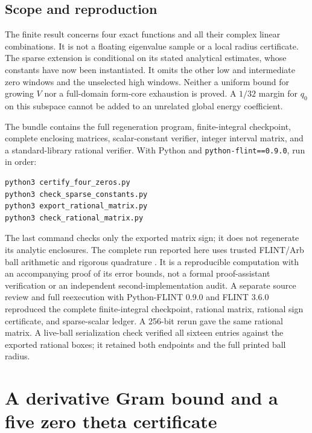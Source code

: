 \documentclass[11pt,a4paper]{article}
\numberwithin{equation}{section}
\theoremstyle{definition}\newtheorem{definition}[theorem]{Definition}
\theoremstyle{remark}\newtheorem{remark}[theorem]{Remark}
\newcommand{\Hh}{\mathcal H}\newcommand{\Hw}{\mathcal H}
\begin{document}
\subsection{Scope and reproduction}

The finite result concerns four exact functions and all their complex
linear combinations. It is not a floating eigenvalue sample or a local
radius certificate. The sparse extension is conditional on its stated
analytical estimates, whose constants have now been instantiated.
It omits the other low and intermediate zero windows and the unselected
high windows. Neither a uniform bound for growing $V$ nor a full-domain
form-core exhaustion is proved. A $1/32$ margin for $q_0$ on this subspace
cannot be added to an unrelated global energy coefficient.

The bundle contains the full regeneration program, finite-integral
checkpoint, complete enclosing matrices, scalar-constant verifier,
integer interval matrix, and a standard-library rational verifier.
With Python and \texttt{python-flint==0.9.0}, run in order:
\begin{verbatim}
python3 certify_four_zeros.py
python3 check_sparse_constants.py
python3 export_rational_matrix.py
python3 check_rational_matrix.py
\end{verbatim}
The last command checks only the exported matrix sign; it does not
regenerate its analytic enclosures. The complete run reported here uses
trusted FLINT/Arb ball arithmetic and rigorous quadrature
\cite{fzArbIntegration,fzFlintIntegral}. It is a reproducible computation
with an accompanying proof of its error bounds, not a formal proof-assistant
verification or an independent second-implementation audit. A separate
source review and full reexecution with Python-FLINT 0.9.0 and FLINT 3.6.0
reproduced the complete finite-integral checkpoint, rational matrix,
rational sign certificate, and sparse-scalar ledger. A 256-bit rerun gave
the same rational matrix. A live-ball serialization check verified all
sixteen entries against the exported rational boxes; it retained both
endpoints and the full printed ball radius.


\section{A derivative Gram bound and a five zero theta certificate}
\label{sec:five-zero-certificate}
\end{document}
